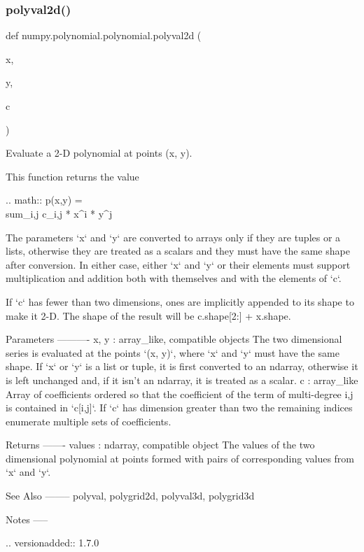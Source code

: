  \mbox{\label{namespacenumpy_1_1polynomial_1_1polynomial_a508893c89ab3e00f61705e14b47a5110}} 
\subsubsection{\texorpdfstring{polyval2d()}{polyval2d()}}
{\footnotesize\ttfamily def numpy.\+polynomial.\+polynomial.\+polyval2d (\begin{DoxyParamCaption}\item[{}]{x,  }\item[{}]{y,  }\item[{}]{c }\end{DoxyParamCaption})}

\begin{DoxyVerb}Evaluate a 2-D polynomial at points (x, y).

This function returns the value

.. math:: p(x,y) = \\sum_{i,j} c_{i,j} * x^i * y^j

The parameters `x` and `y` are converted to arrays only if they are
tuples or a lists, otherwise they are treated as a scalars and they
must have the same shape after conversion. In either case, either `x`
and `y` or their elements must support multiplication and addition both
with themselves and with the elements of `c`.

If `c` has fewer than two dimensions, ones are implicitly appended to
its shape to make it 2-D. The shape of the result will be c.shape[2:] +
x.shape.

Parameters
----------
x, y : array_like, compatible objects
    The two dimensional series is evaluated at the points `(x, y)`,
    where `x` and `y` must have the same shape. If `x` or `y` is a list
    or tuple, it is first converted to an ndarray, otherwise it is left
    unchanged and, if it isn't an ndarray, it is treated as a scalar.
c : array_like
    Array of coefficients ordered so that the coefficient of the term
    of multi-degree i,j is contained in `c[i,j]`. If `c` has
    dimension greater than two the remaining indices enumerate multiple
    sets of coefficients.

Returns
-------
values : ndarray, compatible object
    The values of the two dimensional polynomial at points formed with
    pairs of corresponding values from `x` and `y`.

See Also
--------
polyval, polygrid2d, polyval3d, polygrid3d

Notes
-----

.. versionadded:: 1.7.0\end{DoxyVerb}
 \mbox{\label{namespacenumpy_1_1polynomial_1_1polynomial_af5525861bf035f36104ee5e0f364506a}} 
